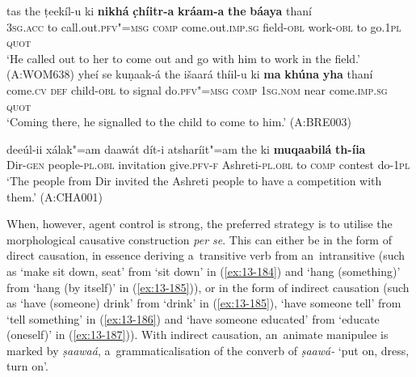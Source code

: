 \ea
\label{ex:13-181}
\gll tas the ṭeekíl-u ki \textbf{nikhá} \textbf{c̣híitr-a} \textbf{kráam-a} \textbf{the} \textbf{báaya} thaní\\
\textsc{3sg.acc} to call.out.\textsc{pfv"=msg} \textsc{comp} come.out.\textsc{imp.sg} field-\textsc{obl}  work-\textsc{obl} to go.\textsc{1pl} \textsc{quot}\\
\glt `He called out to her to come out and go with him to work in the field.' (A:WOM638)
\ex
\label{ex:13-182}
\gll yheí se kuṇaak-á the išaará thíil-u ki \textbf{ma} \textbf{khúna} \textbf{yha} thaní\\
come.\textsc{cv} \textsc{def} child-\textsc{obl} to signal do.\textsc{pfv"=msg} \textsc{comp} \textsc{1sg.nom} near come.\textsc{imp.sg} \textsc{quot}\\
\glt `Coming there, he signalled to the child to come to him.' (A:BRE003)

\ex
\label{ex:13-183}
\gll deeúl-ii xálak"=am daawát dít-i atsharíit"=am the ki \textbf{muqaabilá} \textbf{th-íia}\\
Dir-\textsc{gen}  people-\textsc{pl.obl} invitation give.\textsc{pfv-f} Ashreti-\textsc{pl.obl} to \textsc{comp} contest do-\textsc{1pl}\\
\glt `The people from Dir invited the Ashreti people to have a competition with them.' (A:CHA001) 
\z

When, however, agent control is strong, the preferred strategy is to utilise the morphological causative construction \textit{per se}. This can either be in the form of direct causation, in essence deriving a~transitive verb from an~intransitive (such as `make sit down, seat' from `sit down' in (\ref{ex:13-184}) and `hang (something)' from `hang (by itself)' in (\ref{ex:13-185})), or in the form of indirect causation (such as `have (someone) drink' from `drink' in (\ref{ex:13-185}), `have someone tell' from `tell something' in (\ref{ex:13-186}) and `have someone educated' from `educate (oneself)' in (\ref{ex:13-187})). With indirect causation, an~animate manipulee is marked by \textit{ṣaawaá}, a~grammaticalisation of the converb of \textit{ṣaawá-} `put on, dress, turn on'.

